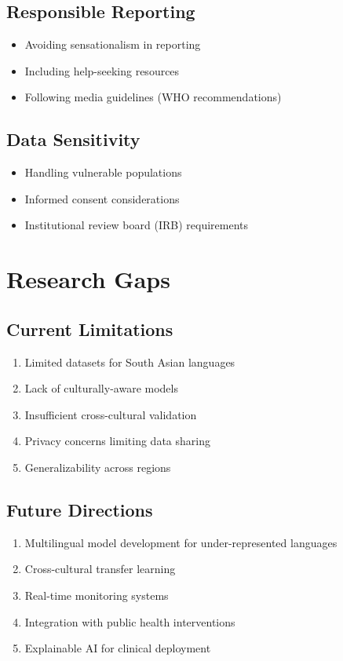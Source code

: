 \documentclass[12pt,a4paper]{article}
\begin{document}
\subsection{Responsible Reporting}
\begin{itemize}
    \item Avoiding sensationalism in reporting
    \item Including help-seeking resources
    \item Following media guidelines (WHO recommendations)
\end{itemize}

\subsection{Data Sensitivity}
\begin{itemize}
    \item Handling vulnerable populations
    \item Informed consent considerations
    \item Institutional review board (IRB) requirements
\end{itemize}

\section{Research Gaps}

\subsection{Current Limitations}
\begin{enumerate}
    \item Limited datasets for South Asian languages
    \item Lack of culturally-aware models
    \item Insufficient cross-cultural validation
    \item Privacy concerns limiting data sharing
    \item Generalizability across regions
\end{enumerate}

\subsection{Future Directions}
\begin{enumerate}
    \item Multilingual model development for under-represented languages
    \item Cross-cultural transfer learning
    \item Real-time monitoring systems
    \item Integration with public health interventions
    \item Explainable AI for clinical deployment
\end{enumerate}
\end{document}
